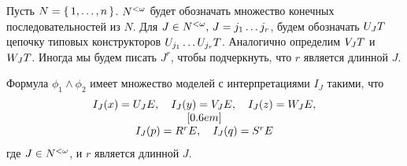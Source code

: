 Пусть  $N=\lbrace \, 1,\ldots,n \, \rbrace$. $N^{<\omega}$ будет обозначать множество конечных последовательностей из $N$. Для $J \in N^{<\omega}, \, J = j_1 \ldots j_r$, будем обозначать ${U}_{J}T$ цепочку типовых конструкторов ${U}_{j_{1}} \ldots {U}_{j_{r}}T$. Аналогично определим ${V}_{J}T$ и ${W}_{J}T$. Иногда мы будем писать $J^r$, чтобы подчеркнуть, что $r$ является длинной $J$.
\begin{thm}{\label{thm:pcpindices}}
Формула $\phi_{1} \land \phi_{2}$ имеет множество моделей с интерпретациями $I_{J}$ такими, что
\[
    \begin{array}{c}
        I_{J}(x) = {U}_{J}{E}, \quad I_{J}(y) = {V}_{J}{E}, \quad I_{J}(z) = {W}_{J}{E}, \\
        [0.6em] \\
        I_{J}(p) = {R}^{r}{E}, \quad I_{J}(q) = {S}^{r}{E}
        
    \end{array}
\]
где $J \in N^{<\omega}$, и $r$ является длинной $J$.
\end{thm}
